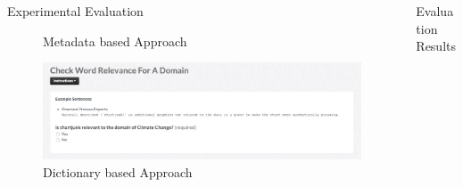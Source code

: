 \documentclass[final,hyperref={pdfpagelabels=true}]{beamer}
\begin{document}
\begin{frame}
\begin{columns}[t, onlytextwidth]
\begin{column}{\textwidth}
\begin{columns}[t, onlytextwidth]
\begin{column}{.49\textwidth}
\begin{block}{Experimental Evaluation}
\begin{minipage}[t][.22\textheight][c]{\textwidth}
\begin{minipage}[t]{0.93\textwidth}
\begin{minipage}[t]{\textwidth}
\begin{minipage}[t]{.49\textwidth}
\begin{minipage}[t]{\textwidth}
\begin{figure}[H]
											 \caption{Metadata based Approach}
										\end{figure}
									\end{minipage}
									\begin{minipage}[t]{\textwidth}
										\vspace{-1.9mm}
										\begin{figure}[H]
										 \centering
										 \includegraphics[width=\textwidth]{figures/questionaire_wordnik_example}
										 \caption{Dictionary based Approach}
										\end{figure}
									\end{minipage}
								\end{minipage}
							\end{minipage}
						\end{minipage}
						\hfill
						\hbox{}
						
					\end{minipage}
				\end{block}
			\end{column}
			\begin{column}{.49\textwidth}
				\begin{block}{Evaluation Results}
					\begin{minipage}[t][.22\textheight][c]{\textwidth}
						
						\hfill
						\begin{minipage}[t]{0.93\textwidth}
							\begin{minipage}[t]{\textwidth}
								\begin{minipage}[t]{.48\textwidth}
									\setlength\abovecaptionskip{0mm}
									\setlength\belowcaptionskip{0mm}
									

\end{minipage}
\end{minipage}
\end{minipage}
\end{minipage}
\end{block}
\end{column}
\end{columns}
\end{column}
\end{columns}
\end{frame}
\end{document}
